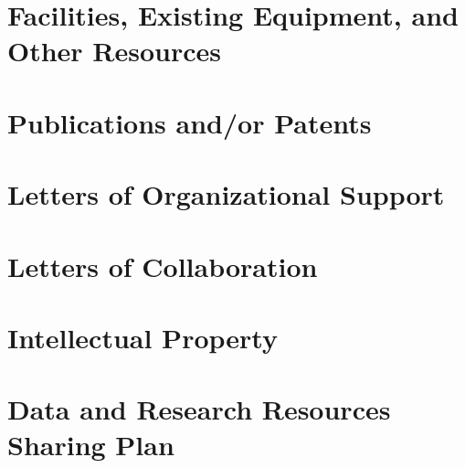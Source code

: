 \documentclass[onecolumn, compsoc,12pt]{IEEEtran}
\begin{document}
\clearpage
{}
\section*{Facilities, Existing Equipment, and Other Resources}





\clearpage

\section*{Publications and/or Patents}

\clearpage

\section*{Letters of Organizational Support}

\clearpage

\section*{Letters of Collaboration}
\clearpage

\section*{Intellectual Property}




\clearpage

\section*{Data and Research Resources Sharing Plan}

\clearpage









\clearpage

%
%


\end{document}
